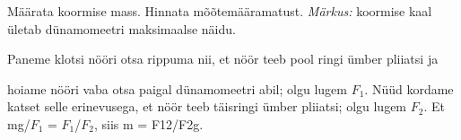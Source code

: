 
Määrata koormise mass. Hinnata mõõtemääramatust.
\textit{Märkus:} koormise kaal ületab dünamomeetri maksimaalse näidu.

\hint

\solu
Paneme klotsi nööri otsa rippuma nii, et nöör teeb pool ringi ümber pliiatsi ja

hoiame nööri vaba otsa paigal dünamomeetri abil; olgu lugem $F_1$. Nüüd kordame katset selle erinevusega, et nöör teeb täisringi ümber pliiatsi; olgu lugem $F_2$. Et mg/$F_1$ = $F_1$/$F_2$, siis m = F12/F2g.
\probend
